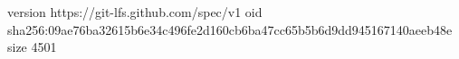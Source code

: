 version https://git-lfs.github.com/spec/v1
oid sha256:09ae76ba32615b6e34c496fe2d160cb6ba47cc65b5b6d9dd945167140aeeb48e
size 4501
